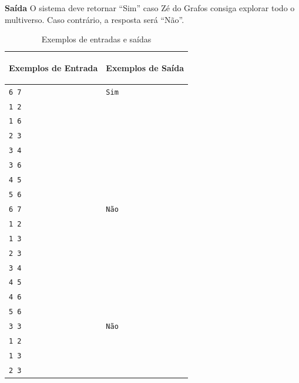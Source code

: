 {\vspace{0.3cm}
\textbf{Saída}
O sistema deve retornar ``Sim'' caso Zé do Grafos consiga explorar todo o multiverso. Caso contrário, a resposta será ``Não''.
\begin{table}[h]
    \centering
    \begin{tabular}{|p{7cm}|p{7cm}|}
        \hline
        \begin{center}
            \vspace{-0.3cm}
            \textbf{Exemplos de Entrada}
            \vspace{-0.3cm}
        \end{center} 
         &  
        \begin{center}
            \vspace{-0.3cm}
            \textbf{Exemplos de Saída}
            \vspace{-0.3cm}
        \end{center} \\ \hline
         \texttt{6 7} & \texttt{Sim} \\  
         \texttt{1 2} & \texttt{} \\
         \texttt{1 6} & \texttt{} \\
         \texttt{2 3} & \texttt{} \\
         \texttt{3 4} & \texttt{} \\
         \texttt{3 6} & \texttt{} \\
         \texttt{4 5} & \texttt{} \\         
         \texttt{5 6} & \texttt{} \\
         \hline
         \texttt{6 7} & \texttt{Não} \\  
         \texttt{1 2} & \texttt{} \\
         \texttt{1 3} & \texttt{} \\
         \texttt{2 3} & \texttt{} \\
         \texttt{3 4} & \texttt{} \\
         \texttt{4 5} & \texttt{} \\
         \texttt{4 6} & \texttt{} \\
         \texttt{5 6} & \texttt{} \\
         \hline
         \texttt{3 3} & \texttt{Não} \\  
         \texttt{1 2} & \texttt{} \\
         \texttt{1 3} & \texttt{} \\
         \texttt{2 3} & \texttt{} \\
         \hline
    \end{tabular}
    \caption{Exemplos de entradas e saídas}
    \label{tab:inputJJ}
\end{table}}

\newpage

\begin{center}
\noindent

\end{center}

